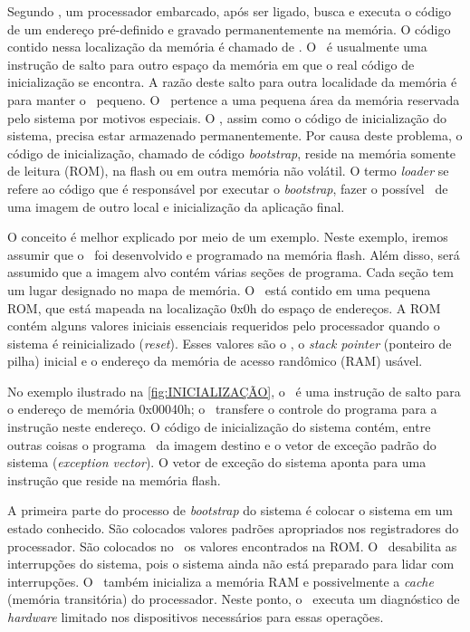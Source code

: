 Segundo , um processador embarcado, após ser ligado, busca e executa o código de um endereço pré-definido e gravado permanentemente na memória. O código contido nessa localização da memória é chamado de \resetv. O \resetv\ é usualmente uma instrução de salto para outro espaço da memória em que o real código de inicialização se encontra. A razão deste salto para outra localidade da memória é para manter o \resetv\ pequeno. O \resetv\ pertence a uma pequena área da memória reservada pelo sistema por motivos especiais. O \resetv, assim como o código de inicialização do sistema, precisa estar armazenado permanentemente. Por causa deste problema, o código de inicialização, chamado de código \textit{bootstrap}, reside na memória somente de leitura (ROM), na flash ou em outra memória não volátil. O termo \textit{loader} se refere ao código que é responsável por executar o \textit{bootstrap}, fazer o possível \download\ de uma imagem de outro local e inicialização da aplicação final.

O conceito é melhor explicado por meio de um exemplo. Neste exemplo, iremos assumir que o \loader\ foi desenvolvido e programado na memória flash. Além disso, será assumido que a imagem alvo contém várias seções de programa. Cada seção tem um lugar designado no mapa de memória. O \resetv\ está contido em uma pequena ROM, que está mapeada na localização 0x0h do espaço de endereços. A ROM contém alguns valores iniciais essenciais requeridos pelo processador quando o sistema é reinicializado (\textit{reset}). Esses valores são o \resetv, o \textit{stack pointer} (ponteiro de pilha) inicial e o endereço da memória de acesso randômico (RAM) usável. 

No exemplo ilustrado na \autoref{fig:INICIALIZAÇÃO}, o \resetv\ é uma instrução de salto para o endereço de memória 0x00040h; o \resetv\ transfere o controle do programa para a instrução neste endereço. O código de inicialização do sistema contém, entre outras coisas o programa \loader\ da imagem destino e o vetor de exceção padrão do sistema (\textit{exception vector}). O vetor de exceção do sistema aponta para uma instrução que reside na memória flash.

A primeira parte do processo de \textit{bootstrap} do sistema é colocar o sistema em um estado conhecido. São colocados valores padrões apropriados nos registradores do processador. São colocados no \stackp\ os valores encontrados na ROM. O \loader\ desabilita as interrupções do sistema, pois o sistema ainda não está preparado para lidar com interrupções. O \loader\ também inicializa a memória RAM e possivelmente a \textit{cache} (memória transitória) do processador. Neste ponto, o \loader\ executa um diagnóstico de \textit{hardware} limitado nos dispositivos necessários para essas operações.

